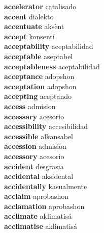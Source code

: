 \textbf{accelerator } catalisado \\
\textbf{accent } dialekto \\
\textbf{accentuate } aksènt \\
\textbf{accept } konsentí \\
\textbf{acceptability } aceptabilidad \\
\textbf{acceptable } aseptabel \\
\textbf{acceptableness } aceptabilidad \\
\textbf{acceptance } adopshon \\
\textbf{acceptation } adopshon \\
\textbf{accepting } aceptando \\
\textbf{access } admision \\
\textbf{accessary } acesorio \\
\textbf{accessibility } accesibilidad \\
\textbf{accessible } alkansabel \\
\textbf{accession } admision \\
\textbf{accessory } acesorio \\
\textbf{accident } desgrasia \\
\textbf{accidental } aksidental \\
\textbf{accidentally } kasualmente \\
\textbf{acclaim } aprobashon \\
\textbf{acclamation } aprobashon \\
\textbf{acclimate } aklimatisá \\
\textbf{acclimatise } aklimatisá \\
